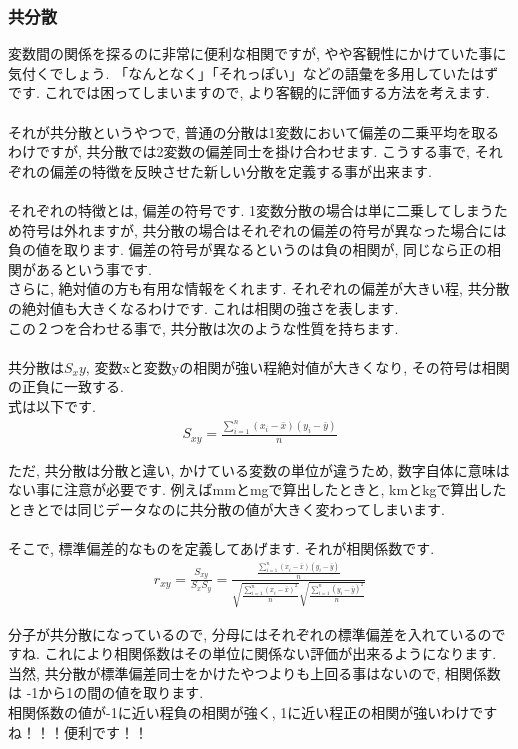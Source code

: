 \documentclass[11pt,a4paper]{jreport}
\begin{document}
\subsubsection{共分散}
変数間の関係を探るのに非常に便利な相関ですが, やや客観性にかけていた事に気付くでしょう. 「なんとなく」「それっぽい」などの語彙を多用していたはずです. これでは困ってしまいますので, より客観的に評価する方法を考えます.\\
\\
それが共分散というやつで, 普通の分散は1変数において偏差の二乗平均を取るわけですが, 共分散では2変数の偏差同士を掛け合わせます. こうする事で, それぞれの偏差の特徴を反映させた新しい分散を定義する事が出来ます. \\
\\
それぞれの特徴とは, 偏差の符号です. 1変数分散の場合は単に二乗してしまうため符号は外れますが, 共分散の場合はそれぞれの偏差の符号が異なった場合には負の値を取ります. 偏差の符号が異なるというのは負の相関が, 同じなら正の相関があるという事です.\\
さらに, 絶対値の方も有用な情報をくれます. それぞれの偏差が大きい程, 共分散の絶対値も大きくなるわけです. これは相関の強さを表します.\\
この２つを合わせる事で, 共分散は次のような性質を持ちます.\\
\\
共分散は$S_xy$, 変数xと変数yの相関が強い程絶対値が大きくなり, その符号は相関の正負に一致する.
\\
式は以下です.\\
\begin{eqnarray}
\label{eq:covar}
S_{xy} = \frac{\sum_{i=1}^{n} (x_i - \bar{x})(y_i - \bar{y})}{n}
\end{eqnarray}

ただ, 共分散は分散と違い, かけている変数の単位が違うため, 数字自体に意味はない事に注意が必要です. 例えばmmとmgで算出したときと, kmとkgで算出したときとでは同じデータなのに共分散の値が大きく変わってしまいます.\\
\\
そこで, 標準偏差的なものを定義してあげます. それが相関係数です.\\

\begin{eqnarray}
r_{xy} = \frac{S_{xy}}{S_x S_y} = \frac{\frac{\sum_{i=1}^{n} (x_i - \bar{x})(y_i - \bar{y})}{n}}{\sqrt{\frac{\sum_{i=1}^{n} (x_i - \bar{x})^2}{n}} \sqrt{\frac{\sum_{i=1}^{n} (y_i - \bar{y})^2}{n}}}
\end{eqnarray}

分子が共分散になっているので, 分母にはそれぞれの標準偏差を入れているのですね. これにより相関係数はその単位に関係ない評価が出来るようになります. 当然, 共分散が標準偏差同士をかけたやつよりも上回る事はないので, 相関係数は -1から1の間の値を取ります.\\
相関係数の値が-1に近い程負の相関が強く, 1に近い程正の相関が強いわけですね！！！便利です！！\\
\end{document}
